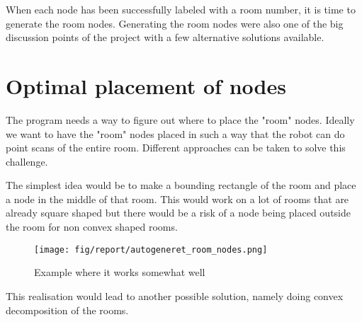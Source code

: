 When each node has been successfully labeled with a room number, it is time to generate the room nodes. Generating the room nodes were also one of the big discussion points of the project with a few alternative solutions available.
\section{Optimal placement of nodes}
The program needs a way to figure out where to place the "room" nodes. Ideally we want to have the "room" nodes placed in such a way that the robot can do point scans of the entire room. Different approaches can be taken to solve this challenge. 

The simplest idea would be to make a bounding rectangle of the room and place a node in the middle of that room. This would work on a lot of rooms that are already square shaped but there would be a risk of a node being placed outside the room for non convex shaped rooms. 
\begin{figure}[H]
    \centering
    \texttt{[image: fig/report/autogeneret\_room\_nodes.png]}
    \label{}
    \caption[Design overview]{Example where it works somewhat well}
\end{figure}
This realisation would lead to another possible solution, namely doing convex decomposition of the rooms.




